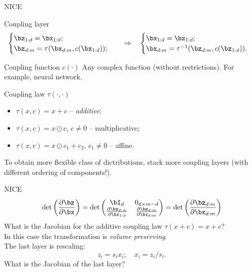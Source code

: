 \begin{frame}{NICE}
	\begin{block}{Coupling layer}
		\vspace{-0.8cm}
		\begin{equation*}
			\begin{cases} \bz_{1:d} = \bx_{1:d}; \\ \bz_{d:m} = \tau (\bx_{d:m}, c(\bx_{1:d}));\end{cases} 
			\quad \Rightarrow \quad 
			\begin{cases} \bx_{1:d} = \bz_{1:d}; \\ \bx_{d:m} = \tau^{-1} (\bz_{d:m}, c(\bz_{1:d})).\end{cases}
		\end{equation*}
		\vspace{-0.5cm}
	\end{block}
	\begin{block}{Coupling function $c(\cdot)$}
		Any complex function (without restrictions). For example, neural network.
	\end{block}
	\begin{block}{Coupling law $\tau(\cdot, \cdot)$}
		\begin{itemize}
			\item $\tau(x, c) = x + c$ -- \textit{additive};
			\item $\tau(x, c) = x \odot c, \, c \neq 0$ -- multiplicative;
			\item $\tau(x, c) = x \odot c_1 + c_2, \, c_1 \neq 0$ -- affine.
		\end{itemize}
	\end{block}
	To obtain more flexible class of dictributions, stack more coupling layers (with different ordering of components!). \\
	
\end{frame}
\begin{frame}{NICE}
	\[
	\det \left( \frac{\partial \bz}{\partial \bx} \right) = \det 
	\begin{pmatrix}
		\bI_d & 0_{d \times m - d} \\
		\frac{\partial \bz_{d:m}}{\partial \bx_{1:d}} & \frac{\partial \bz_{d:m}}{\partial \bx_{d:m}}
	\end{pmatrix} = 
	\det \left( \frac{\partial \bz_{d:m}}{\partial \bx_{d:m}} \right)
	\]
	What is the Jacobian for the additive coupling law $\tau(x + c) = x + c$? \\
	In this case the transformation is \textit{volume preserving}. \\
	The last layer is rescaling:
	\[
	z_i = s_i x_i; \quad x_i = z_i / s_i.
	\]
	What is the Jacobian of the last layer?
\end{frame}
